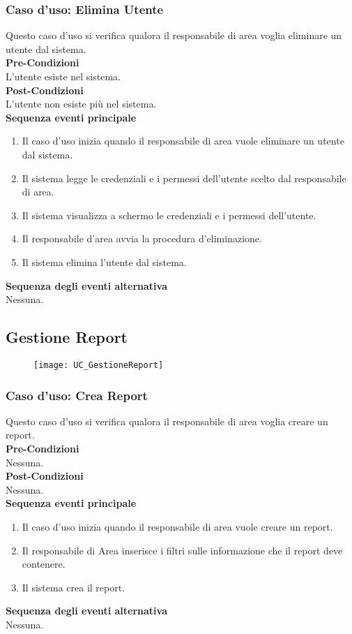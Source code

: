 \documentclass[green, fancy, 11pt]{elegantbook}
\begin{document}
\subsubsection{Caso d'uso: Elimina Utente}
\noindent
Questo caso d’uso si verifica qualora il responsabile di area voglia eliminare un utente dal sistema.\\
\textbf{Pre-Condizioni}\\
L’utente esiste nel sistema.\\
\textbf{Post-Condizioni}\\
L’utente non esiste più nel sistema.\\
\textbf{Sequenza eventi principale}
\begin{enumerate}
	\item Il caso d’uso inizia quando il responsabile di area vuole eliminare un utente dal sistema.
	\item Il sistema legge le credenziali e i permessi dell’utente scelto dal responsabile di area.
	\item Il sistema visualizza a schermo le credenziali e i permessi dell’utente.
	\item Il responsabile d’area avvia la procedura d’eliminazione.
	\item Il sistema elimina l’utente dal sistema.
\end{enumerate}
\textbf{Sequenza degli eventi alternativa}\\
Nessuna.\\

\subsection{Gestione Report}
\begin{figure}[H]
	\texttt{[image: UC\_GestioneReport]}
\end{figure}

\subsubsection{Caso d’uso: Crea Report}
\noindent
Questo caso d’uso si verifica qualora il responsabile di area voglia creare un report.\\
\textbf{Pre-Condizioni}\\
Nessuna.\\
\textbf{Post-Condizioni}\\
Nessuna.\\
\textbf{Sequenza eventi principale}
\begin{enumerate}
	\item Il caso d’uso inizia quando il responsabile di area vuole creare un report.
	\item Il responsabile di Area inserisce i filtri sulle informazione che il report deve contenere.
	\item Il sistema crea il report.
\end{enumerate}
\textbf{Sequenza degli eventi alternativa}\\
Nessuna.
\end{document}
